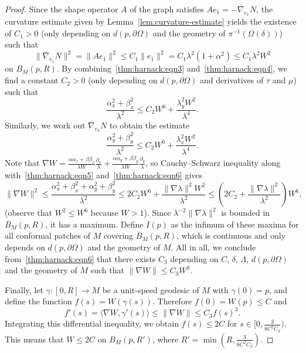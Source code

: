 \documentclass[a4paper,10pt,reqno]{amsart}
\theoremstyle{definition}
\theoremstyle{remark}
\numberwithin{equation}{section}
\begin{document}
\begin{proof}
Since the shape operator $A$ of the graph satisfies $Ae_1=-\overline\nabla_{e_1}N$, the curvature estimate given by Lemma~\ref{lem:curvature-estimate} yields the existence of $C_1>0$ (only depending on $d(p,\partial\Omega)$ and the geometry of $\pi^{-1}(\Omega(\delta))$) such that
\begin{equation}\label{thm:harnack:eqn4}\|\overline\nabla_{e_1}N\|^2=\|Ae_1\|^2\leq C_1\|e_1\|^2=C_1\lambda^2(1+\alpha^2)\leq C_1\lambda^2W^2
\end{equation}
on $B_M(p,R)$. By combining~\eqref{thm:harnack:eqn3} and~\eqref{thm:harnack:eqn4}, we find a constant $C_2>0$ (only depending on $d(p,\partial\Omega)$ and derivatives of $\tau$ and $\mu$) such that
\begin{equation}\label{thm:harnack:eqn5}
\frac{\alpha_x^2+\beta_x^2}{\lambda^2}\leq C_2W^6+\frac{\lambda_y^2W^2}{\lambda^4}.
\end{equation}
Similarly, we work out $\overline\nabla_{e_2}N$ to obtain the estimate
\begin{equation}\label{thm:harnack:eqn6}
\frac{\alpha_y^2+\beta_y^2}{\lambda^2}\leq C_2W^6+\frac{\lambda_x^2W^2}{\lambda^4}.
\end{equation}
Note that $\nabla W=\frac{\alpha\alpha_x+\beta\beta_x}{\lambda W}\frac{\partial_x}{\lambda}+\frac{\alpha\alpha_y+\beta\beta_y}{\lambda W}\frac{\partial_y}{\lambda}$, so Cauchy--Schwarz inequality along with~\eqref{thm:harnack:eqn5} and~\eqref{thm:harnack:eqn6} gives
\[\|\nabla W\|^2\leq\frac{\alpha_x^2+\beta_x^2+\alpha_y^2+\beta_y^2}{\lambda^2}\leq 2C_2W^6+\frac{\|\nabla\lambda\|^2W^2}{\lambda^2}\leq\left(2C_2+\frac{\|\nabla\lambda\|^2}{\lambda^2}\right) W^6,\]
(observe that $W^2\leq W^6$ because $W>1$). Since $\lambda^{-2}\|\nabla\lambda\|^2$ is bounded in $\overline B_M(p,R)$, it has a maximum. Define $I(p)$ as the infimum of these maxima for all conformal patches of $M$ covering $\overline B_M(p,R)$, which is continuous and only depends on $d(p,\partial\Omega)$ and the geometry of $M$. All in all, we conclude from~\eqref{thm:harnack:eqn6} that there exists $C_3$ depending on $C$, $\delta$, $\Lambda$, $d(p,\partial\Omega)$ and the geometry of $M$ such that $\|\nabla W\|\leq C_3W^3$.

Finally, let $\gamma:[0,R]\to M$ be a unit-speed geodesic of $M$ with $\gamma(0)=p$, and define the function $f(s)=W(\gamma(s))$. Therefore $f(0)=W(p)\leq C$ and 
\[f'(s)=\langle\nabla W,\gamma'(s)\rangle\leq\|\nabla W\|\leq C_3f(s)^3.\]
Integrating this differential inequality, we obtain $f(s)\leq 2C$ for $s\in[0,\frac{3}{8C^2C_3})$. This means that $W\leq 2C$ on $B_M(p,R')$, where $R'=\min(R,\frac{3}{8C^2C_3})$. 
\end{proof}
	
\end{document}
